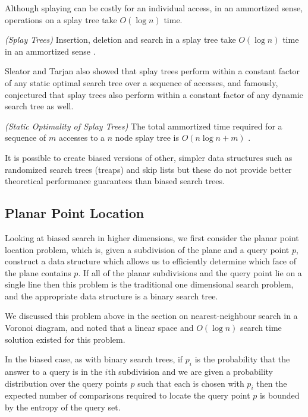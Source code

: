 \documentclass[mcs]{scsthesis}
\begin{document}
Although splaying can be costly for an individual access, in an ammortized
sense, operations on a splay tree take \(O(\log n)\) time.

\begin{thm} \emph{(Splay Trees)} 
Insertion, deletion and search in a splay tree take \(O(\log n)\) time in
an ammortized sense \cite{splaytree}.
\end{thm}

Sleator and Tarjan also showed that splay trees perform within a constant
factor of any static optimal search tree over a sequence of accesses, and
famously, conjectured that splay trees also perform within a constant factor
of any dynamic search tree as well.

\begin{thm} \emph{(Static Optimality of Splay Trees)} 
The total ammortized time required for a sequence of $m$ accesses to a $n$
node splay tree is \(O(n \log n + m)\) \cite{splaytree}.
\end{thm}

It is possible to create biased versions of other, simpler data structures
such as randomized search trees (treaps) \cite{treap} and skip lists
\cite{bsl2} but these do not provide better theoretical performance guarantees
than biased search trees.

\subsection{Planar Point Location}

Looking at biased search in higher dimensions, we first consider the planar
point location problem, which is, given a subdivision of the plane and a
query point \(p\), construct a data structure which allows us to efficiently
determine which face of the plane contains \(p\). If all of the planar
subdivisions and the query point lie on a single line then this problem is the
traditional one dimensional search problem, and the appropriate data structure
is a binary search tree.

We discussed this problem above in the section on nearest-neighbour
search in a Voronoi diagram, and noted that a linear space and \(O(\log n)\)
search time solution existed for this problem.

In the biased case, as with binary search trees, if \(p_i\) is the probability
that the answer to a query is in the \(i\)th subdivision and we are given a
probability distribution over the query points \(p\) such that each is chosen
with \(p_i\) then the expected number of comparisons required to locate the
query point \(p\) is bounded by the entropy of the query set.
\end{document}
